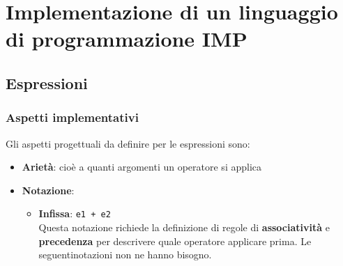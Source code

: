 \documentclass[a4paper]{article}
\begin{document}
\section{Implementazione di un linguaggio di programmazione IMP}

\subsection{Espressioni}

\subsubsection{Aspetti implementativi}
Gli aspetti progettuali da definire per le espressioni sono:
\begin{itemize}
  \item \textbf{Arietà}: cioè a quanti argomenti un operatore si applica

  \item \textbf{Notazione}:
    \begin{itemize}
      \item \textbf{Infissa}: \texttt{e1 + e2}\\ Questa notazione richiede 
        la definizione di regole di \textbf{associatività} e \textbf{precedenza}
        per descrivere quale operatore applicare prima. Le seguentinotazioni non
        ne hanno bisogno.



\end{itemize}
\end{itemize}
\end{document}
